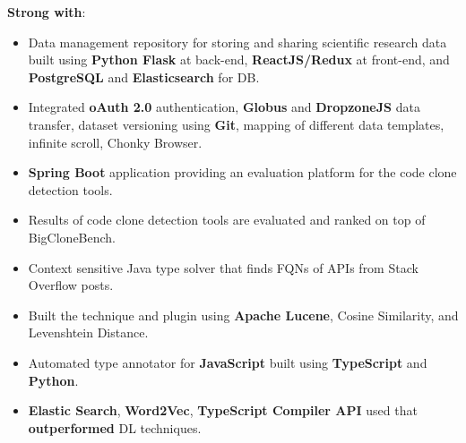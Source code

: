 \documentclass[10pt,a4paper,ragged2e,withhyper]{altacv}
\begin{document}
\begin{paracol}{2}
\begin{small}
\textbf{Strong with}:
     
\end{small}
\newpage

\nocite{*}


\switchcolumn

\begin{itemize}
\item  Data management repository for storing and sharing scientific research data built using \textbf{Python Flask} at back-end, \textbf{ReactJS/Redux} at front-end, and \textbf{PostgreSQL} and \textbf{Elasticsearch} for DB. 
\item Integrated \textbf{oAuth 2.0} authentication, \textbf{Globus} and \textbf{DropzoneJS} data transfer, dataset versioning using \textbf{Git}, mapping of different data templates, infinite scroll, Chonky Browser. 
\end{itemize}

\begin{itemize}
\item \textbf{Spring Boot} application providing an evaluation platform for the code clone detection tools.
\item Results of code clone detection tools are evaluated and ranked on top of BigCloneBench.
\end{itemize}

\begin{itemize}
\item Context sensitive Java type solver that finds FQNs of APIs from Stack Overflow posts.
\item Built the technique and plugin using \textbf{Apache Lucene}, Cosine Similarity, and Levenshtein Distance.
\end{itemize}

\begin{itemize}
\item Automated type annotator for \textbf{JavaScript} built using \textbf{TypeScript} and \textbf{Python}.
\item \textbf{Elastic Search}, \textbf{Word2Vec}, \textbf{TypeScript Compiler API} used that \textbf{outperformed} DL techniques.
\end{itemize}


\end{paracol}
\end{document}

